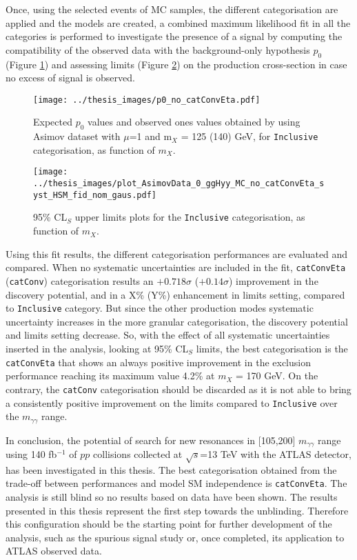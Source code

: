 \documentclass[a4paper, oneside, 11pt]{book}
\begin{document}
	Once, using the selected events of MC samples, the different categorisation are applied and the models are created, a combined maximum likelihood fit in all the categories is performed to investigate the presence of a signal by computing the compatibility of the observed data with the background-only hypothesis $p_0$ \cite{Statistic} (Figure \ref{fig:p0}) and assessing limits \cite{Statistic} (Figure \ref{fig:limits}) on the production cross-section in case no excess of signal is observed.
	\begin{figure}
		\centering
		\texttt{[image: ../thesis\_images/p0\_no\_catConvEta.pdf]}
		\caption{Expected $p_0$ values and observed ones values obtained by using Asimov dataset with $\mu$=1 and m$_X$ = 125 (140) GeV, for \texttt{Inclusive} categorisation, as function of $m_X$.}
		\label{fig:p0}
	\end{figure}
	\begin{figure}
		\centering
		\texttt{[image: ../thesis\_images/plot\_AsimovData\_0\_ggHyy\_MC\_no\_catConvEta\_syst\_HSM\_fid\_nom\_gaus.pdf]}
		\caption{95\% CL$_S$ upper limits plots for the \texttt{Inclusive} categorisation, as function of $m_X$.}
		\label{fig:limits}
	\end{figure}Using this fit results, the different categorisation performances are evaluated and compared. When no systematic uncertainties are included in the fit, \texttt{catConvEta} (\texttt{catConv}) categorisation results an $+0.718\sigma$ ($+0.14\sigma$) improvement in the discovery potential, and in a  X\% (Y\%) enhancement in limits setting, compared to \texttt{Inclusive} category. But since the other production modes systematic uncertainty increases in the more granular categorisation, the discovery potential and limits setting decrease. So, with the effect of all systematic uncertainties inserted in the analysis, looking at 95\% CL$_S$ limits, the best categorisation is the \texttt{catConvEta} that shows an always positive improvement in the exclusion performance reaching its maximum value 4.2\% at $m_X$ = 170 GeV. On the contrary, the \texttt{catConv} categorisation should be discarded as it is not able to bring a consistently positive improvement on the limits compared to \texttt{Inclusive} over the $m_{\gamma\gamma}$ range.
	
	In conclusion, the potential of search for new resonances in [105,200] $m_{\gamma\gamma}$ range using 140 fb$^{-1}$ of $pp$ collisions collected at $\sqrt{s}$=13 TeV with the ATLAS detector, has been investigated in this thesis. The best categorisation obtained from the trade-off between performances and model SM independence is \texttt{catConvEta}. The analysis is still blind so no results based on data have been shown. The results presented in this thesis represent the first step towards the unblinding. Therefore this configuration should be the starting point for further development of the analysis, such as the spurious signal study or, once completed, its application to ATLAS observed data.
	
\end{document}
